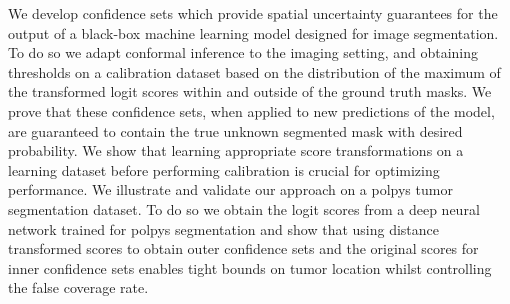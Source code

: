 We develop confidence sets which provide spatial uncertainty guarantees for the output of a black-box machine learning model designed for image segmentation. To do so we adapt conformal inference to the imaging setting, and obtaining thresholds on a calibration dataset based on the distribution of the maximum of the transformed logit scores within and outside of the ground truth masks. We prove that these confidence sets, when applied to new predictions of the model, are guaranteed to contain the true unknown segmented mask with desired probability. We show that learning appropriate score transformations on a learning dataset before performing calibration is crucial for optimizing performance. We illustrate and validate our approach on a polpys tumor segmentation dataset. To do so we obtain the logit scores from a deep neural network trained for polpys segmentation and show that using distance transformed scores to obtain outer confidence sets and the original scores for inner confidence sets enables tight bounds on tumor location whilst controlling the false coverage rate. 